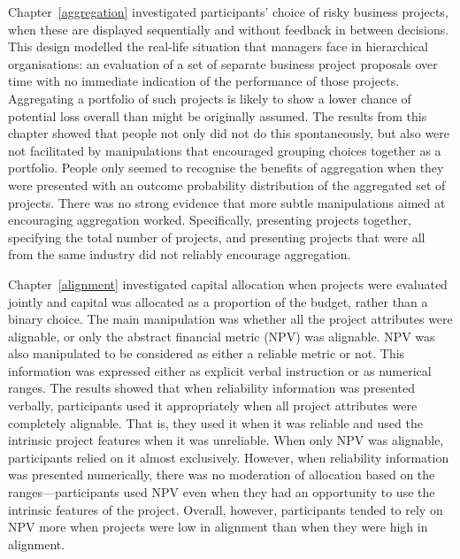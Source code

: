 \documentclass[a4paper, nobind, dvipsnames]{templates/ociamthesis}
\theoremstyle{definition}
\theoremstyle{definition}
\theoremstyle{definition}
\theoremstyle{definition}
\theoremstyle{remark}
\begin{document}
Chapter~\ref{aggregation} investigated participants' choice of risky business
projects, when these are displayed sequentially and without feedback in between
decisions. This design modelled the real-life situation that managers face in
hierarchical organisations: an evaluation of a set of separate business project
proposals over time with no immediate indication of the performance of those
projects. Aggregating a portfolio of such projects is likely to show a lower
chance of potential loss overall than might be originally assumed. The results
from this chapter showed that people not only did not do this spontaneously, but
also were not facilitated by manipulations that encouraged grouping choices
together as a portfolio. People only seemed to recognise the benefits of
aggregation when they were presented with an outcome probability distribution of
the aggregated set of projects. There was no strong evidence that more subtle
manipulations aimed at encouraging aggregation worked. Specifically, presenting
projects together, specifying the total number of projects, and presenting
projects that were all from the same industry did not reliably encourage
aggregation.

Chapter~\ref{alignment} investigated capital allocation when projects were
evaluated jointly and capital was allocated as a proportion of the budget,
rather than a binary choice. The main manipulation was whether all the project
attributes were alignable, or only the abstract financial metric (NPV) was
alignable. NPV was also manipulated to be considered as either a reliable metric
or not. This information was expressed either as explicit verbal instruction or
as numerical ranges. The results showed that when reliability information was
presented verbally, participants used it appropriately when all project
attributes were completely alignable. That is, they used it when it was reliable
and used the intrinsic project features when it was unreliable. When only NPV
was alignable, participants relied on it almost exclusively. However, when
reliability information was presented numerically, there was no moderation of
allocation based on the ranges---participants used NPV even when they had an
opportunity to use the intrinsic features of the project. Overall, however,
participants tended to rely on NPV more when projects were low in alignment than
when they were high in alignment.
\end{document}
